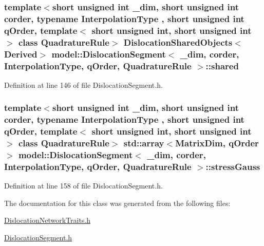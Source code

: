 \subsubsection[{shared}]{\setlength{\rightskip}{0pt plus 5cm}template$<$short unsigned int \+\_\+dim, short unsigned int corder, typename Interpolation\+Type , short unsigned int q\+Order, template$<$ short unsigned int, short unsigned int $>$ class Quadrature\+Rule$>$ {\bf Dislocation\+Shared\+Objects}$<${\bf Derived}$>$ {\bf model\+::\+Dislocation\+Segment}$<$ \+\_\+dim, corder, Interpolation\+Type, q\+Order, Quadrature\+Rule $>$\+::shared}\label{classmodel_1_1_dislocation_segment_af62dc8d8b77556c77499e16f677af359}


Definition at line 146 of file Dislocation\+Segment.\+h.

\hypertarget{classmodel_1_1_dislocation_segment_a6b4c7c4a5fe56d79ff519dd0ef801767}{}
\subsubsection[{stress\+Gauss}]{\setlength{\rightskip}{0pt plus 5cm}template$<$short unsigned int \+\_\+dim, short unsigned int corder, typename Interpolation\+Type , short unsigned int q\+Order, template$<$ short unsigned int, short unsigned int $>$ class Quadrature\+Rule$>$ std\+::array$<${\bf Matrix\+Dim}, q\+Order$>$ {\bf model\+::\+Dislocation\+Segment}$<$ \+\_\+dim, corder, Interpolation\+Type, q\+Order, Quadrature\+Rule $>$\+::stress\+Gauss}\label{classmodel_1_1_dislocation_segment_a6b4c7c4a5fe56d79ff519dd0ef801767}


Definition at line 158 of file Dislocation\+Segment.\+h.



The documentation for this class was generated from the following files\+:\begin{DoxyCompactItemize}
\item 
\hyperlink{_dislocation_network_traits_8h}{Dislocation\+Network\+Traits.\+h}\item 
\hyperlink{_dislocation_segment_8h}{Dislocation\+Segment.\+h}\end{DoxyCompactItemize}
